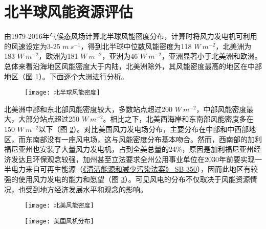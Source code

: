 \section{北半球风能资源评估}

由1979-2016年气候态风场计算北半球风能密度分布，计算时将风力发电机可利用的风速设定为3-25 $m ~ s^{-1}$，得到北半球中位数风能密度为118 $W ~ m^{-2}$，北美洲为183 $W ~ m^{-2}$，欧洲为181 $W ~ m^{-2}$，亚洲为46 $W ~ m^{-2}$，亚洲显著小于北美洲和欧洲。总体来看沿海地区风能密度大于内陆，北美洲除外，其风能密度最高的地区在中部地区（图 \ref{fig:NHwindpower}）。下面逐个大洲进行分析。

\begin{figure}[!htbp]
    \centering
    \texttt{[image: 北半球风能密度]}
    \label{fig:NHwindpower}
\end{figure}

北美洲中部和东北部风能密度较大，多数站点超过200 $W ~ m^{-2}$，中部风能密度最大，大部分站点超过250 $W ~ m^{-2}$。相比之下，北美西海岸和东南部风能密度多在150 $W ~ m^{-2}$以下（图 \ref{fig:NAwindpower}）。对比美国风力发电场分布，主要分布在中部和中西部地区，而东南部没有一座风电场，这与风能密度分布基本吻合。然而，西南部的加利福尼亚州也安装了大量风力发电机，占到全美总量的24\%，原因是加利福尼亚州经济发达且环保观念较强，加州甚至立法要求全州公用事业单位在2030年前要实现一半电力来自可再生能源（\href{https://www.energy.ca.gov/rules-and-regulations/energy-suppliers-reporting/clean-energy-and-pollution-reduction-act-sb-350}{《清洁能源和减少污染法案》 SB 350}），因而此地区有较强的使用风力发电的能力和愿望（图 \ref{fig:NAturbinelocation}）。可见风电的分布不仅取决于风能资源情况，也受到地方经济发展水平和观念的影响。

\begin{figure}[!htb]
    \centering
    \texttt{[image: 北美风能密度]}
    \label{fig:NAwindpower}
\end{figure}

\begin{figure}[!htb]
    \centering
    \texttt{[image: 美国风机分布]}
    \label{fig:NAturbinelocation}
\end{figure}

